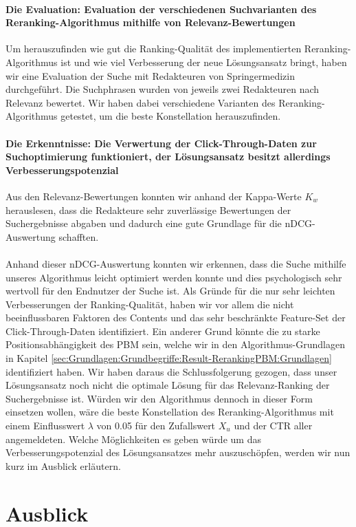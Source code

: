 \paragraph{Die Evaluation: Evaluation der verschiedenen Suchvarianten des Reranking-Algorithmus mithilfe von Relevanz-Bewertungen}
Um herauszufinden wie gut die Ranking-Qualität des implementierten Reranking-Algorithmus ist und wie viel Verbesserung der neue Lösungsansatz bringt, haben wir eine Evaluation der Suche mit Redakteuren von Springermedizin durchgeführt. Die Suchphrasen wurden von jeweils zwei Redakteuren nach Relevanz bewertet. Wir haben dabei verschiedene Varianten des Reranking-Algorithmus getestet, um die beste Konstellation herauszufinden. 

\paragraph{Die Erkenntnisse: Die Verwertung der Click-Through-Daten zur Suchoptimierung funktioniert, der Lösungsansatz besitzt allerdings Verbesserungspotenzial}
Aus den Relevanz-Bewertungen konnten wir anhand der Kappa-Werte $K_w$ herauslesen, dass die Redakteure sehr zuverlässige Bewertungen der Suchergebnisse abgaben und dadurch eine gute Grundlage für die nDCG-Auswertung schafften.
\\
\\
Anhand dieser nDCG-Auswertung konnten wir erkennen, dass die Suche mithilfe unseres Algorithmus leicht optimiert werden konnte und dies psychologisch sehr wertvoll für den Endnutzer der Suche ist. Als Gründe für die nur sehr leichten Verbesserungen der Ranking-Qualität, haben wir vor allem die nicht beeinflussbaren Faktoren des Contents und das sehr beschränkte Feature-Set der Click-Through-Daten identifiziert. Ein anderer Grund könnte die zu starke Positionsabhängigkeit des PBM sein, welche wir in den Algorithmus-Grundlagen in Kapitel \ref{sec:Grundlagen:Grundbegriffe:Result-RerankingPBM:Grundlagen} identifiziert haben. Wir haben daraus die Schlussfolgerung gezogen, dass unser Lösungsansatz noch nicht die optimale Lösung für das Relevanz-Ranking der Suchergebnisse ist. Würden wir den Algorithmus dennoch in dieser Form einsetzen wollen, wäre die beste Konstellation des Reranking-Algorithmus mit einem Einflusswert $\lambda$ von 0.05 für den Zufallswert $X_u$ und der CTR aller angemeldeten. Welche Möglichkeiten es geben würde um das Verbesserungspotenzial des Lösungsansatzes mehr auszuschöpfen, werden wir nun kurz im Ausblick erläutern.

\section{Ausblick}
\label{sec:ZusammenfassungAusblick:Ausblick}

